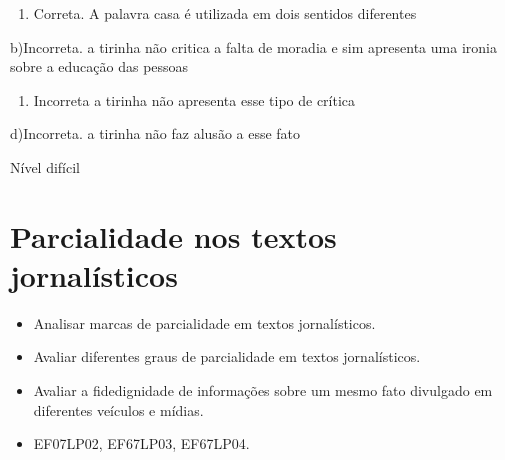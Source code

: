 {\begin{enumerate}
\def\labelenumi{\arabic{enumi}.}
\tightlist
\item
  Correta. A palavra casa é utilizada em dois sentidos diferentes
\end{enumerate}

b)Incorreta. a tirinha não critica a falta de moradia e sim apresenta
uma ironia sobre a educação das pessoas

\begin{enumerate}
\def\labelenumi{\arabic{enumi}.}
\tightlist
\item
  Incorreta a tirinha não apresenta esse tipo de crítica
\end{enumerate}

d)Incorreta. a tirinha não faz alusão a esse fato

Nível difícil


\chapter{Parcialidade nos textos jornalísticos}


\begin{itemize}

  \item Analisar marcas de parcialidade em textos jornalísticos.

  \item Avaliar diferentes graus de parcialidade em textos jornalísticos.

  \item Avaliar a fidedignidade de informações sobre um mesmo fato divulgado 
  em diferentes veículos e mídias.

\end{itemize}


\begin{itemize}

  \item EF07LP02, EF67LP03, EF67LP04.

\end{itemize}

}
